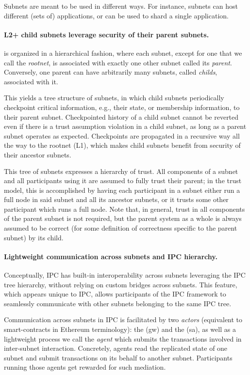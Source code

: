 Subnets are meant to be used in different ways. For instance, subnets can host different (sets of) applications, or can be used to shard a single application.

\paragraph{L2+ child subnets leverage security of their parent subnets.} \ipc is organized in a hierarchical fashion, where each subnet, except for one that we call the \emph{\gls{rootnet}}, is associated with exactly one other subnet called its \emph{\gls{parent}}.
Conversely, one parent can have arbitrarily many subnets, called \emph{\glspl{child}}, associated with it.

This yields a tree structure of subnets, in which child subnets periodically checkpoint critical information, e.g., their \gls{state}, or \gls{membership} information, to their parent subnet. Checkpointed history of a child subnet cannot be reverted even if there is a trust assumption violation in a child subnet, as long as a parent subnet operates as expected. Checkpoints are propagated in a recursive way all the way to the rootnet (L1), which makes child subnets benefit from security of their ancestor subnets. 

This tree of subnets expresses a hierarchy of trust.
All components of a subnet and all \glspl{participant} using it are assumed to fully trust their parent; in the \ipc trust model, this is accomplished by having each participant in a subnet either run a full node in said subnet and all its ancestor subnets, or it trusts some other participant which runs a full node. 
Note that, in general, trust in all components of the parent subnet is not required, but the parent system as a whole is always assumed to be correct (for some definition of correctness specific to the parent subnet) by its child.

\paragraph{Lightweight communication across subnets and IPC hierarchy.}
Conceptually, IPC has built-in interoperability across subnets leveraging the IPC tree hierarchy, without relying on custom bridges across subnets.
This feature, which appears unique to IPC, allows \glspl{participant} of the IPC framework to seamlessly communicate with other subnets belonging to the same IPC tree. 

Communication across subnets in IPC is facilitated by two \emph{\glspl{actor}} (equivalent to smart-contracts in Ethereum terminology):
the \gwFull (\gls{gw}) and the \saFull (\gls{sa}), as well as a lightweight process we call the \emph{\gls{agent}} which submits the transactions involved in inter-subnet interaction. Concretely, \ipc agents read the replicated state of one subnet and submit transactions on its behalf to another subnet.
Participants running those \ipc agents get rewarded for such mediation. 


